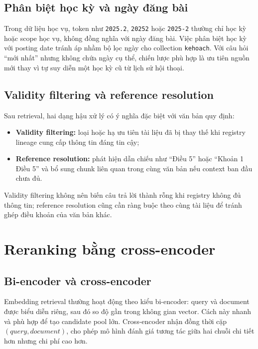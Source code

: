 \documentclass[../DoAn.tex]{subfiles}
\begin{document}
\subsection{Phân biệt học kỳ và ngày đăng bài}

Trong dữ liệu học vụ, token như \texttt{2025.2}, \texttt{20252} hoặc
\texttt{2025-2} thường chỉ học kỳ hoặc scope học vụ, không đồng nghĩa với ngày
đăng bài. Việc phân biệt học kỳ với posting date tránh áp nhầm bộ lọc ngày cho
collection \texttt{kehoach}. Với câu hỏi ``mới nhất'' nhưng không chứa ngày cụ
thể, chiến lược phù hợp là ưu tiên nguồn mới thay vì tự suy diễn một học kỳ cũ từ
lịch sử hội thoại.

\subsection{Validity filtering và reference resolution}

Sau retrieval, hai dạng hậu xử lý có ý nghĩa đặc biệt với văn bản quy định:

\begin{itemize}
    \item \textbf{Validity filtering:} loại hoặc hạ ưu tiên tài liệu đã bị thay
    thế khi registry lineage cung cấp thông tin đáng tin cậy;
    \item \textbf{Reference resolution:} phát hiện dẫn chiếu như ``Điều 5'' hoặc
    ``Khoản 1 Điều 5'' và bổ sung chunk liên quan trong cùng văn bản nếu context
    ban đầu chưa đủ.
\end{itemize}

Validity filtering không nên biến câu trả lời thành rỗng khi registry không đủ
thông tin; reference resolution cũng cần ràng buộc theo cùng tài liệu để tránh
ghép điều khoản của văn bản khác.

\section{Reranking bằng cross-encoder}

\subsection{Bi-encoder và cross-encoder}

Embedding retrieval thường hoạt động theo kiểu bi-encoder: query và document
được biểu diễn riêng, sau đó so độ gần trong không gian vector. Cách này nhanh và
phù hợp để tạo candidate pool lớn. Cross-encoder nhận đồng thời cặp
$(query, document)$, cho phép mô hình đánh giá tương tác giữa hai chuỗi chi tiết
hơn nhưng chi phí cao hơn.
\end{document}
